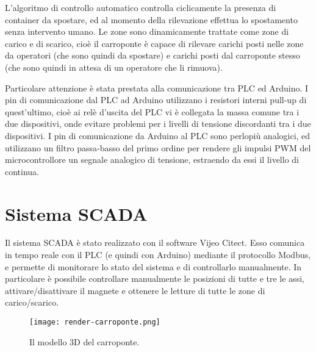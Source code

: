 L'algoritmo di controllo automatico controlla ciclicamente la presenza di container da spostare, ed
al momento della rilevazione effettua lo spostamento senza intervento umano. Le zone sono
dinamicamente trattate come zone di carico e di scarico, cioè il carroponte è capace di rilevare
carichi posti nelle zone da operatori (che sono quindi da spostare) e carichi posti dal carroponte
stesso (che sono quindi in attesa di un operatore che li rimuova).

Particolare attenzione è stata prestata alla comunicazione tra PLC ed Arduino. I pin di
comunicazione dal PLC ad Arduino utilizzano i resistori interni pull-up di quest'ultimo, cioè ai
relè d'uscita del PLC vi è collegata la massa comune tra i due dispositivi, onde evitare problemi
per i livelli di tensione discordanti tra i due dispositivi. I pin di comunicazione da Arduino al
PLC sono perlopiù analogici, ed utilizzano un filtro passa-basso del primo ordine per rendere gli
impulsi PWM del microcontrollore un segnale analogico di tensione, estraendo da essi il livello di
continua.

\section{Sistema SCADA}

Il sistema SCADA è stato realizzato con il software Vijeo Citect. Esso comunica in tempo reale con
il PLC (e quindi con Arduino) mediante il protocollo Modbus, e permette di monitorare lo stato del
sistema e di controllarlo manualmente. In particolare è possibile controllare manualmente le
posizioni di tutte e tre le assi, attivare/disattivare il magnete e ottenere le letture di tutte le
zone di carico/scarico.


\begin{figure}[htbp]\centering
    \caption{Il modello 3D del carroponte.}
    \texttt{[image: render-carroponte.png]}
\end{figure}

\printbibliography



